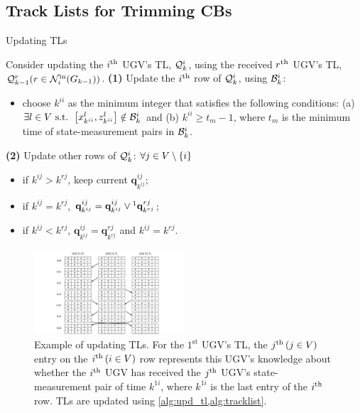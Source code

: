 	\subsection{Track Lists for Trimming CBs}\label{subsec:tracklist}
	
	\begin{algorithm}
		\caption{Updating TLs}
		\label{alg:upd_tl}
		\begin{algorithmic}
			\State Consider updating the $i^\text{th}$ UGV's TL, $\mathcal{Q}^i_k$, using the received $r^\text{th}$ UGV's TL, $\mathcal{Q}^r_{k-1}(r\in \mathcal{N}^\text{in}_i(G_{k-1}))$.		
			\State \textbf{(1)} Update the $i^\text{th}$ row of $\mathcal{Q}^i_k$, using $\mathcal{B}^i_k$:
			\begin{itemize}
				\item choose $k^{ii}$ as the minimum integer that satisfies the following conditions: (a) $\exists l\in V \text{ s.t. } \left[x^l_{k^{ii}},z^l_{k^{ii}}\right]\notin \mathcal{B}^i_k$ and (b) $k^{ii} \ge t_m-1$, where $t_m$ is the minimum time of state-measurement pairs in $\mathcal{B}^i_k$.
			\end{itemize}
			\State \textbf{(2)} Update other rows of $\mathcal{Q}^i_k$:
			$\forall j\in V\setminus\left\lbrace i\right\rbrace$
			\begin{itemize} 
				\item if $k^{ij}>k^{rj}$, keep current $\mathbf{q}^{ij}_{k^{ij}}$;
				\item if $k^{ij}=k^{rj}$, $\mathbf{q}^{ij}_{k^{ij}}=\mathbf{q}^{ij}_{k^{ij}} \lor\footnotemark\mathbf{q}^{rj}_{k^{rj}}$; 
				\item if $k^{ij}<k^{rj}$, $\mathbf{q}^{ij}_{k^{ij}}=\mathbf{q}^{rj}_{k^{rj}}$ and $k^{ij}=k^{rj}$.
			\end{itemize}
		\end{algorithmic}
	\end{algorithm}
	
	\begin{figure}%
		\centering
		\includegraphics[width=0.50\textwidth]{figures/track_list}
		\caption{Example of updating TLs. For the $1^\text{st}$ UGV's TL, the $j^\text{th}\,(j\in V)$ entry on the $i^\text{th}\,(i\in V)$ row represents this UGV's knowledge about whether the $i^\text{th}$ UGV has received the $j^\text{th}$ UGV's state-measurement pair of time $k^{1i}$, where $k^{1i}$ is the last entry of the $i^\text{th}$ row. TLs are updated using \cref{alg:upd_tl,alg:tracklist}.}
		\label{fig:upd_tl}
	\end{figure}
	
